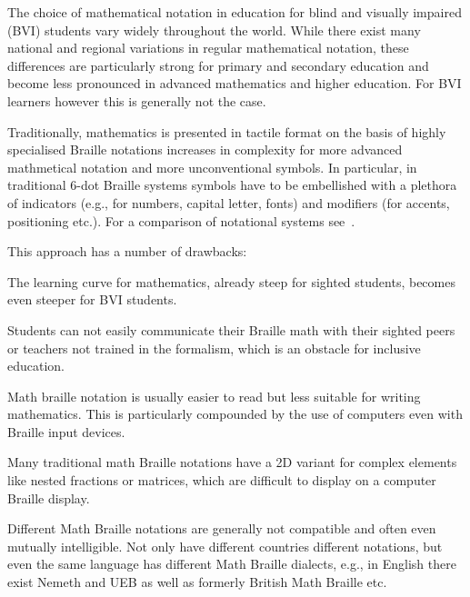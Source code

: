 \documentclass{article}
\begin{document}
The choice of mathematical notation in education for blind and visually impaired
(BVI) students vary widely throughout the world. While there exist many national
and regional variations in regular mathematical notation, these differences are
particularly strong for primary and secondary education and become less
pronounced in advanced mathematics and higher education. For BVI learners
however this is generally not the case.

Traditionally, mathematics is presented in tactile format on the basis of highly
specialised Braille notations increases in complexity for more advanced
mathmetical notation and more unconventional symbols. In particular, in
traditional 6-dot Braille systems symbols have to be embellished with a plethora
of indicators (e.g., for numbers, capital letter, fonts) and modifiers (for
accents, positioning etc.). For a comparison of notational systems
see~\cite{van2022towards}.

This approach has a number of drawbacks: 
\begin{inparaenum}
\item The learning curve for mathematics, already steep for sighted students,
  becomes even steeper for BVI students.
\item Students can not easily communicate their Braille math with their sighted
  peers or teachers not trained in the formalism, which is an obstacle for
  inclusive education.
\item Math braille notation is usually easier to read but less suitable for
  writing mathematics. This is particularly compounded by the use of computers
  even with Braille input devices.
\item Many traditional math Braille notations have a 2D variant for complex
  elements like nested fractions or matrices, which are difficult to display on
  a computer Braille display.
\item Different Math Braille notations are generally not compatible and often
  even mutually intelligible. Not only have different countries different
  notations, but even the same language has different Math Braille dialects,
  e.g., in English there exist Nemeth and UEB as well as formerly British Math
  Braille etc.
\end{inparaenum}
\end{document}
